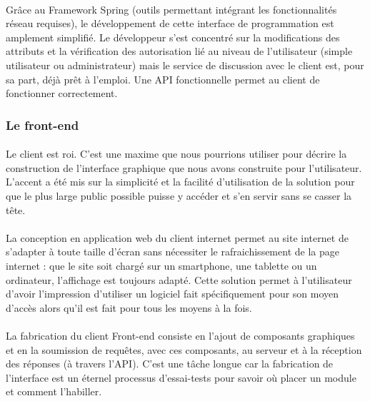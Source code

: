 \documentclass[a4paper, 12pt]{article}
\begin{document}
\paragraph{}Grâce au Framework Spring (outils permettant intégrant les fonctionnalités réseau requises), le développement de cette interface de programmation est amplement simplifié. Le développeur s’est concentré sur la modifications des attributs et la vérification des autorisation lié au niveau de l'utilisateur (simple utilisateur ou administrateur) mais le service de discussion avec le client est, pour sa part, déjà prêt à l’emploi.
\noindent Une API fonctionnelle permet au client de fonctionner correctement.

\subsubsection{Le front-end}

\paragraph{}Le client est roi. C’est une maxime que nous pourrions utiliser pour décrire la construction de l’interface graphique que nous avons construite pour l’utilisateur. L’accent a été mis sur la simplicité et la facilité d’utilisation de la solution pour que le plus large public possible puisse y accéder et s'en servir sans se casser la tête.
\paragraph{}La conception en application web du client internet permet au site internet de s’adapter à toute taille d’écran sans nécessiter le rafraichissement de la page internet : que le site soit chargé sur un smartphone, une tablette ou un ordinateur, l’affichage est toujours adapté. Cette solution permet à l’utilisateur d’avoir l’impression d’utiliser un logiciel fait spécifiquement pour son moyen d’accès alors qu’il est fait pour tous les moyens à la fois.
\paragraph{}La fabrication du client Front-end consiste en l’ajout de composants graphiques et en la soumission de requêtes, avec ces composants, au serveur et à la réception des réponses (à travers l’API). C’est une tâche longue car la fabrication de l’interface est un éternel processus d’essai-tests pour savoir où placer un module et comment l’habiller.
\end{document}

